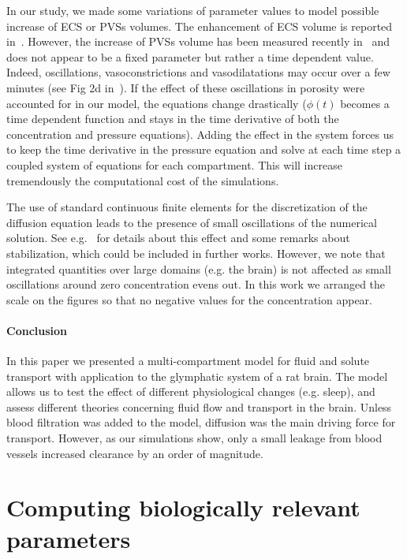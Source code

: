 \documentclass[10pt]{article}
\newcommand{\1}{^{(1)}}
\newcommand{\2}{^{(2)}}
\begin{document}
In our study, we made some variations of parameter values to model possible increase of ECS or PVSs volumes. The enhancement of ECS volume is reported in~\cite{Xie_2013_sleep}. However, the increase of PVSs volume has been measured recently in~\cite{Bojarskaite2022} and does not appear to be a fixed parameter but rather a time dependent value. Indeed, oscillations, vasoconstrictions and vasodilatations may occur over a few minutes (see Fig 2d in~\cite{Bojarskaite2022}). If the effect of these oscillations in porosity were accounted for in our model, the equations change drastically ($\phi(t)$ becomes a time dependent function and stays in the time derivative of both the concentration and pressure equations). Adding the effect in the system forces us to keep the time derivative in the pressure equation and solve at each time step a coupled system of equations for each compartment. This will increase tremendously the computational cost of the simulations. 


The use of standard continuous finite elements for the discretization of the diffusion equation leads to the presence of small oscillations of the numerical solution. See e.g.~\cite{Mardal-2022-mri} for details about this effect and some remarks about stabilization, which could be included in further works. However, we note that integrated quantities over large domains (e.g. the brain) is not affected as small oscillations around zero concentration evens out. In this work we arranged the scale on the figures so that no negative values for the concentration appear. 


\paragraph{Conclusion}
In this paper we presented a multi-compartment model for fluid and solute transport with application to the glymphatic system of a rat brain. The model allows us to test the effect of different physiological changes (e.g. sleep), and assess different theories concerning fluid flow and transport in the brain. Unless blood filtration was added to the model, diffusion was the main driving force for transport. However, as our simulations show, only a small leakage from blood vessels increased clearance by an order of magnitude. 


\appendix


\section{Computing biologically relevant parameters} \label{app:param-values}
\end{document}
